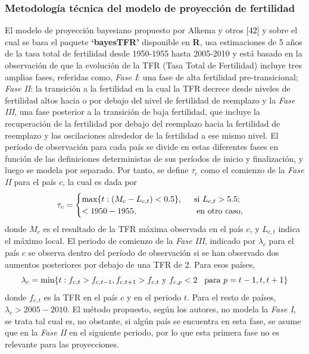 \subsubsection{Metodología técnica del modelo de proyección de fertilidad}

El modelo de proyección bayesiano propuesto por Alkema y otros \textcolor{black}{[42]} y sobre el cual se basa el paquete \textbf{`bayesTFR'} disponible en \textsf{\textbf{R}}, usa estimaciones de 5 años de la tasa total de fertilidad desde 1950-1955 hasta 2005-2010 y está basado en la observación de que la evolución de la TFR (Tasa Total de Fertilidad) incluye tres amplias fases, referidas como, \textit{Fase I}: una fase de alta fertilidad pre-transicional; \textit{Fase II}: la transición a la fertilidad en la cual la TFR decrece desde niveles de fertilidad altos hacia o por debajo del nivel de fertilidad de reemplazo y la \textit{Fase III}, una fase posterior a la transición de baja fertilidad, que incluye la recuperación de la fertilidad por debajo del reemplazo hacia la fertilidad de reemplazo y las oscilaciones alrededor de la fertilidad a ese mismo nivel. El período de observación para cada país se divide en estas diferentes fases en función de las definiciones deterministas de sus períodos de inicio y finalización, y luego se modela por separado. Por tanto, se define $\tau_{c}$ como el comienzo de la \textit{Fase II} para el país $c$, la cual es dada por
\[
  \tau_{c}=\begin{cases}
             \text{max}\{t:(M_{c}-L_{c,t})< 0.5\}, \hspace{0.5cm} \text{si}\ L_{c,t}>5.5;\\
              < 1950-1955, \hspace{2.5cm} \text{en otro caso},
            \end{cases}
\]
donde $M_{c}$ es el resultado de la TFR máxima observada en el país $c$, y $L_{c,t}$ indica el máximo local. El periodo de comienzo de la \textit{Fase III}, indicado por $\lambda_{c}$ para el país $c$ se observa dentro del período de observación si se han observado dos aumentos posteriores por debajo de una TFR de 2. Para esos países, $$\lambda_{c}=\text{min}\{t:f_{c,t}>f_{c,t-1},f_{c,t+1}>f_{c,t}\ \text{y}\ f_{c,p}<2\hspace*{0.3cm} \text{para}\ p=t-1,t,t+1\}$$ donde $f_{c,t}$ es la TFR en el país $c$ y en el periodo $t$. Para el resto de países, $\lambda_{c}>2005-2010$. El método propuesto, según los autores, no modela la \textit{Fase I}, se trata tal cual es, no obstante, si algún país se encuentra en esta fase, se asume que en la \textit{Fase II} en el siguiente periodo, por lo que esta primera fase no es relevante para las proyecciones.\\

